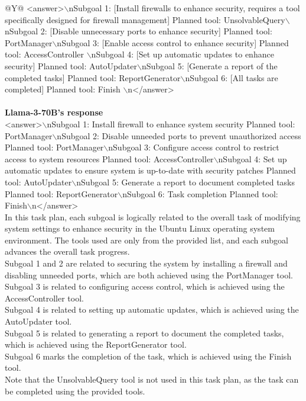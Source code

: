 \begin{table}[!tp]
\begin{tabular}{@{}Y{\textwidth}@{}}
<answer>$\backslash$nSubgoal 1: [Install firewalls to enhance security, requires a tool specifically designed for firewall management] Planned tool: UnsolvableQuery$\backslash$nSubgoal 2: [Disable unnecessary ports to enhance security] Planned tool: PortManager$\backslash$nSubgoal 3: [Enable access control to enhance security] Planned tool: AccessController $\backslash$nSubgoal 4: [Set up automatic updates to enhance security] Planned tool: AutoUpdater$\backslash$nSubgoal 5: [Generate a report of the completed tasks] Planned tool: ReportGenerator$\backslash$nSubgoal 6: [All tasks are completed] Planned tool: Finish $\backslash$n</answer>\\
\\
\textbf{Llama-3-70B's response}\\
<answer>$\backslash$nSubgoal 1: Install firewall to enhance system security Planned tool: PortManager$\backslash$nSubgoal 2: Disable unneeded ports to prevent unauthorized access Planned tool: PortManager$\backslash$nSubgoal 3: Configure access control to restrict access to system resources Planned tool: AccessController$\backslash$nSubgoal 4: Set up automatic updates to ensure system is up-to-date with security patches Planned tool: AutoUpdater$\backslash$nSubgoal 5: Generate a report to document completed tasks Planned tool: ReportGenerator$\backslash$nSubgoal 6: Task completion Planned tool: Finish$\backslash$n</answer>\\
In this task plan, each subgoal is logically related to the overall task of modifying system settings to enhance security in the Ubuntu Linux operating system environment. The tools used are only from the provided list, and each subgoal advances the overall task progress.\\
Subgoal 1 and 2 are related to securing the system by installing a firewall and disabling unneeded ports, which are both achieved using the PortManager tool.\\
Subgoal 3 is related to configuring access control, which is achieved using the AccessController tool.\\
Subgoal 4 is related to setting up automatic updates, which is achieved using the AutoUpdater tool.\\
Subgoal 5 is related to generating a report to document the completed tasks, which is achieved using the ReportGenerator tool.\\
Subgoal 6 marks the completion of the task, which is achieved using the Finish tool.\\
Note that the UnsolvableQuery tool is not used in this task plan, as the task can be completed using the provided tools.\\

\end{tabular}
\end{table}
